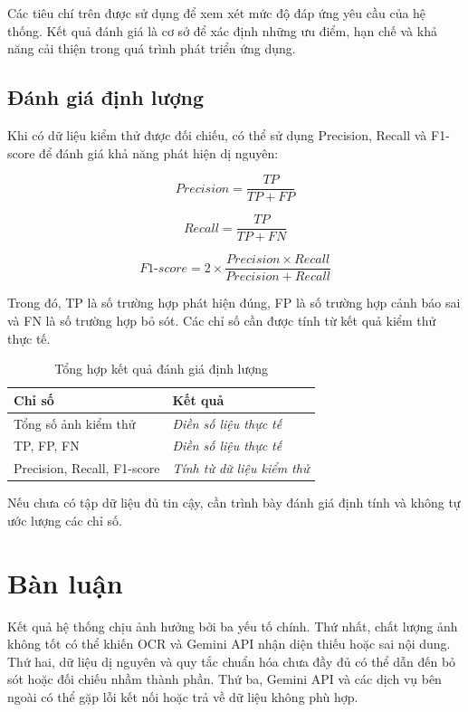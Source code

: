 Các tiêu chí trên được sử dụng để xem xét mức độ đáp ứng yêu cầu
của hệ thống. Kết quả đánh giá là cơ sở để xác định những ưu điểm,
hạn chế và khả năng cải thiện trong quá trình phát triển ứng dụng.
\subsection{Đánh giá định lượng}

Khi có dữ liệu kiểm thử được đối chiếu, có thể sử dụng Precision,
Recall và F1-score để đánh giá khả năng phát hiện dị nguyên:

\[
Precision = \frac{TP}{TP + FP}
\]

\[
Recall = \frac{TP}{TP + FN}
\]

\[
F1\text{-}score =
2 \times \frac{Precision \times Recall}{Precision + Recall}
\]

Trong đó, TP là số trường hợp phát hiện đúng, FP là số trường hợp
cảnh báo sai và FN là số trường hợp bỏ sót. Các chỉ số cần được tính
từ kết quả kiểm thử thực tế.

\begin{table}[htbp]
	\centering
	\caption{Tổng hợp kết quả đánh giá định lượng}
	\label{tab:ch5-ketqua-dinhluong}
	\small
	\renewcommand{\arraystretch}{1.15}
	\setlength{\tabcolsep}{4pt}
	\begin{tabularx}{\textwidth}{|>{\raggedright\arraybackslash}p{4.2cm}|>{\centering\arraybackslash}X|}
		\hline
		\textbf{Chỉ số} & \textbf{Kết quả} \\ \hline
		Tổng số ảnh kiểm thử & \textit{Điền số liệu thực tế} \\ \hline
		TP, FP, FN & \textit{Điền số liệu thực tế} \\ \hline
		Precision, Recall, F1-score & \textit{Tính từ dữ liệu kiểm thử} \\ \hline
	\end{tabularx}
\end{table}

Nếu chưa có tập dữ liệu đủ tin cậy, cần trình bày đánh giá định tính
và không tự ước lượng các chỉ số.

\section{Bàn luận}

Kết quả hệ thống chịu ảnh hưởng bởi ba yếu tố chính. Thứ nhất,
chất lượng ảnh không tốt có thể khiến OCR và Gemini API nhận diện
thiếu hoặc sai nội dung. Thứ hai, dữ liệu dị nguyên và quy tắc chuẩn
hóa chưa đầy đủ có thể dẫn đến bỏ sót hoặc đối chiếu nhầm thành phần.
Thứ ba, Gemini API và các dịch vụ bên ngoài có thể gặp lỗi kết nối
hoặc trả về dữ liệu không phù hợp.

